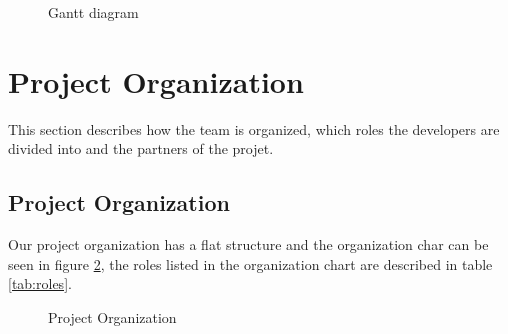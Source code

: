 \begin{figure}[!ht]
	\noindent{}
	\caption{Gantt diagram\label{fig:gantt}}
\end{figure}


\section{Project Organization}
This section describes how the team is organized, which roles the developers are divided into and the partners of the projet.

\subsection{Project Organization}
Our project organization has a flat structure and the organization char can be seen in figure \ref{fig:orgchart}, the roles listed in the organization chart are described in table \ref{tab:roles}.

\begin{figure}[here]
	\noindent{}
	\caption{Project Organization\label{fig:orgchart}}
\end{figure}

